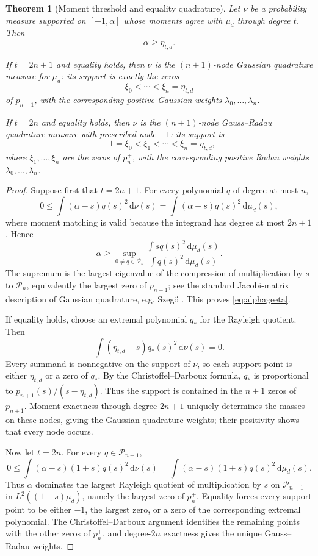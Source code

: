 \documentclass[11pt]{amsart}
\newtheorem{theorem}{Theorem}[section]
\theoremstyle{definition}
\theoremstyle{remark}
\newcommand{\dd}{\,\mathrm d}
\begin{document}
\begin{theorem}[Moment threshold and equality quadrature]\label{thm:FLselfcontained}
Let $\nu$ be a probability measure supported on $[-1,\alpha]$ whose moments agree with $\mu_d$ through degree $t$.  Then
\begin{equation}\label{eq:alphageeta}
 \boxed{\alpha\ge\eta_{t,d}.}
\end{equation}

If $t=2n+1$ and equality holds, then $\nu$ is the $(n+1)$-node Gaussian quadrature measure for $\mu_d$: its support is exactly the zeros
\[
 \xi_0<\cdots<\xi_n=\eta_{t,d}
\]
of $p_{n+1}$, with the corresponding positive Gaussian weights $\lambda_0,\ldots,\lambda_n$.

If $t=2n$ and equality holds, then $\nu$ is the $(n+1)$-node Gauss--Radau quadrature measure with prescribed node $-1$: its support is
\[
 -1=\xi_0<\xi_1<\cdots<\xi_n=\eta_{t,d},
\]
where $\xi_1,\ldots,\xi_n$ are the zeros of $p_n^+$, with the corresponding positive Radau weights $\lambda_0,\ldots,\lambda_n$.
\end{theorem}

\begin{proof}
Suppose first that $t=2n+1$.  For every polynomial $q$ of degree at most $n$,
\[
 0\le\int(\alpha-s)q(s)^2\dd\nu(s)
 =\int(\alpha-s)q(s)^2\dd\mu_d(s),
\]
where moment matching is valid because the integrand has degree at most $2n+1$.  Hence
\[
 \alpha\ge
 \sup_{0\ne q\in\mathcal P_n}
 \frac{\int s q(s)^2\dd\mu_d(s)}{\int q(s)^2\dd\mu_d(s)}.
\]
The supremum is the largest eigenvalue of the compression of multiplication by $s$ to $\mathcal P_n$, equivalently the largest zero of $p_{n+1}$; see the standard Jacobi-matrix description of Gaussian quadrature, e.g. Szeg\H{o} \cite{Szego1975}.  This proves \eqref{eq:alphageeta}.

If equality holds, choose an extremal polynomial $q_*$ for the Rayleigh quotient.  Then
\[
 \int(\eta_{t,d}-s)q_*(s)^2\dd\nu(s)=0.
\]
Every summand is nonnegative on the support of $\nu$, so each support point is either $\eta_{t,d}$ or a zero of $q_*$.  By the Christoffel--Darboux formula, $q_*$ is proportional to $p_{n+1}(s)/(s-\eta_{t,d})$.  Thus the support is contained in the $n+1$ zeros of $p_{n+1}$.  Moment exactness through degree $2n+1$ uniquely determines the masses on these nodes, giving the Gaussian quadrature weights; their positivity shows that every node occurs.

Now let $t=2n$.  For every $q\in\mathcal P_{n-1}$,
\[
 0\le\int(\alpha-s)(1+s)q(s)^2\dd\nu(s)
 =\int(\alpha-s)(1+s)q(s)^2\dd\mu_d(s).
\]
Thus $\alpha$ dominates the largest Rayleigh quotient of multiplication by $s$ on $\mathcal P_{n-1}$ in $L^2((1+s)\mu_d)$, namely the largest zero of $p_n^+$.  Equality forces every support point to be either $-1$, the largest zero, or a zero of the corresponding extremal polynomial.  The Christoffel--Darboux argument identifies the remaining points with the other zeros of $p_n^+$, and degree-$2n$ exactness gives the unique Gauss--Radau weights.  \qedhere
\end{proof}
\end{document}

